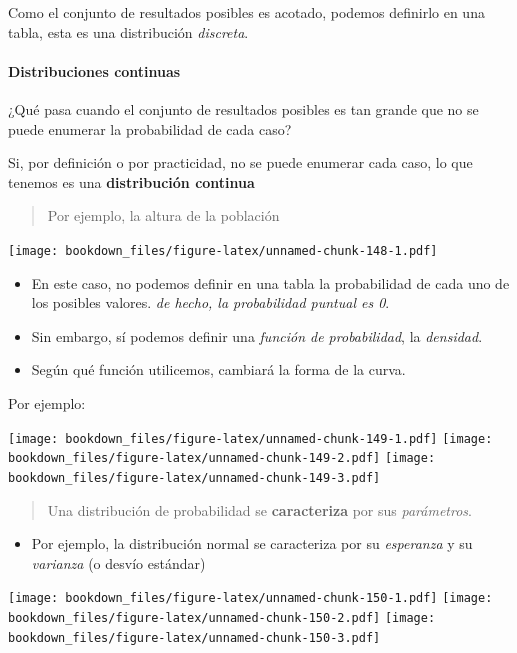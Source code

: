 \documentclass[]{book}
\providecommand{\tightlist}{%
  \setlength{\itemsep}{0pt}\setlength{\parskip}{0pt}}
\let\oldparagraph\paragraph
\renewcommand{\paragraph}[1]{\oldparagraph{#1}\mbox{}}
\begin{document}
Como el conjunto de resultados posibles es acotado, podemos definirlo en una tabla, esta es una distribución \emph{discreta}.

\hypertarget{distribuciones-continuas}{%
\paragraph{Distribuciones continuas}\label{distribuciones-continuas}}

¿Qué pasa cuando el conjunto de resultados posibles es tan grande que no se puede enumerar la probabilidad de cada caso?

Si, por definición o por practicidad, no se puede enumerar cada caso, lo que tenemos es una \textbf{distribución continua}

\begin{quote}
Por ejemplo, la altura de la población
\end{quote}

\texttt{[image: bookdown\_files/figure-latex/unnamed-chunk-148-1.pdf]}

\begin{itemize}
\item
  En este caso, no podemos definir en una tabla la probabilidad de cada uno de los posibles valores. \emph{de hecho, la probabilidad puntual es 0}.
\item
  Sin embargo, sí podemos definir una \emph{función de probabilidad}, la \emph{densidad}.
\item
  Según qué función utilicemos, cambiará la forma de la curva.
\end{itemize}

Por ejemplo:

\texttt{[image: bookdown\_files/figure-latex/unnamed-chunk-149-1.pdf]} \texttt{[image: bookdown\_files/figure-latex/unnamed-chunk-149-2.pdf]} \texttt{[image: bookdown\_files/figure-latex/unnamed-chunk-149-3.pdf]}

\begin{quote}
Una distribución de probabilidad se \textbf{caracteriza} por sus \emph{parámetros}.
\end{quote}

\begin{itemize}
\tightlist
\item
  Por ejemplo, la distribución normal se caracteriza por su \emph{esperanza} y su \emph{varianza} (o desvío estándar)
\end{itemize}

\texttt{[image: bookdown\_files/figure-latex/unnamed-chunk-150-1.pdf]} \texttt{[image: bookdown\_files/figure-latex/unnamed-chunk-150-2.pdf]} \texttt{[image: bookdown\_files/figure-latex/unnamed-chunk-150-3.pdf]}
\end{document}
